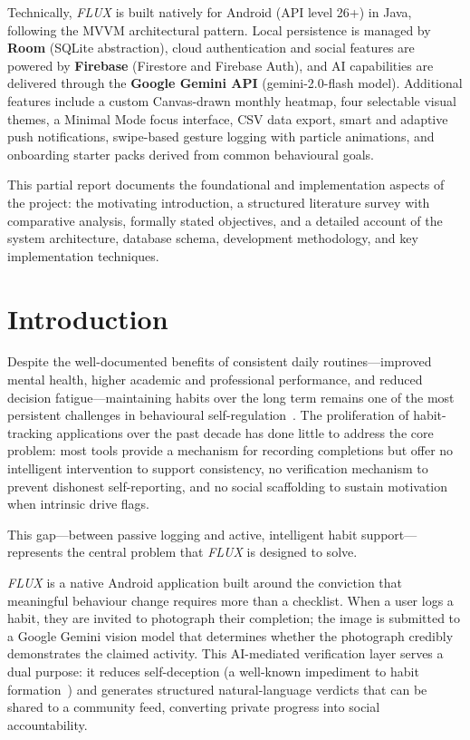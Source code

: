 \documentclass[12pt,a4paper]{article}
\newcommand{\FL}{\textit{FLUX}}
\begin{document}
Technically, \FL{} is built natively for Android (API level 26+) in Java, following
the MVVM architectural pattern. Local persistence is managed by \textbf{Room}
(SQLite abstraction), cloud authentication and social features are powered by
\textbf{Firebase} (Firestore and Firebase Auth), and AI capabilities are delivered
through the \textbf{Google Gemini API} (gemini-2.0-flash model). Additional features
include a custom Canvas-drawn monthly heatmap, four selectable visual themes, a Minimal
Mode focus interface, CSV data export, smart and adaptive push notifications, swipe-based
gesture logging with particle animations, and onboarding starter packs derived from
common behavioural goals.

This partial report documents the foundational and implementation aspects of the
project: the motivating introduction, a structured literature survey with comparative
analysis, formally stated objectives, and a detailed account of the system architecture,
database schema, development methodology, and key implementation techniques.

\section{Introduction}

Despite the well-documented benefits of consistent daily routines---improved mental
health, higher academic and professional performance, and reduced decision
fatigue---maintaining habits over the long term remains one of the most persistent
challenges in behavioural self-regulation~\cite{lally2010}. The proliferation of
habit-tracking applications over the past decade has done little to address the core
problem: most tools provide a mechanism for recording completions but offer no
intelligent intervention to support consistency, no verification mechanism to prevent
dishonest self-reporting, and no social scaffolding to sustain motivation when intrinsic
drive flags.

This gap---between passive logging and active, intelligent habit support---represents
the central problem that \FL{} is designed to solve.

\FL{} is a native Android application built around the conviction that meaningful
behaviour change requires more than a checklist. When a user logs a habit, they are
invited to photograph their completion; the image is submitted to a Google Gemini
vision model that determines whether the photograph credibly demonstrates the claimed
activity. This AI-mediated verification layer serves a dual purpose: it reduces
self-deception (a well-known impediment to habit formation~\cite{xu2021}) and generates
structured natural-language verdicts that can be shared to a community feed, converting
private progress into social accountability.
\end{document}
